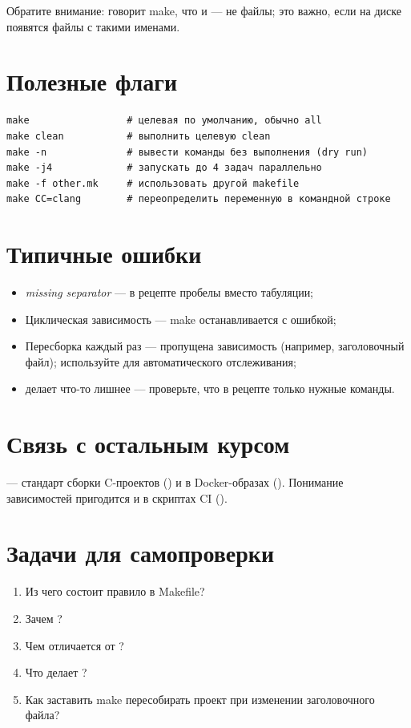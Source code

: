 Обратите внимание:  говорит make, что
 и  --- не файлы; это важно, если
на диске появятся файлы с такими именами.

\section{Полезные флаги }

\begin{verbatim}
make                 # целевая по умолчанию, обычно all
make clean           # выполнить целевую clean
make -n              # вывести команды без выполнения (dry run)
make -j4             # запускать до 4 задач параллельно
make -f other.mk     # использовать другой makefile
make CC=clang        # переопределить переменную в командной строке
\end{verbatim}

\section{Типичные ошибки}
\begin{itemize}
  \item \emph{missing separator} --- в рецепте пробелы
    вместо табуляции;
  \item Циклическая зависимость --- make останавливается
    с ошибкой;
  \item Пересборка каждый раз --- пропущена зависимость
    (например, заголовочный файл); используйте
     для автоматического отслеживания;
  \item {} делает что-то лишнее --- проверьте,
    что в рецепте только нужные команды.
\end{itemize}

\section{Связь с остальным курсом}

 --- стандарт сборки C-проектов
() и в Docker-образах
(). Понимание зависимостей
пригодится и в скриптах CI
().

\section{Задачи для самопроверки}
\begin{enumerate}
  \item Из чего состоит правило в Makefile?
  \item Зачем ?
  \item Чем  отличается от \cmd{\$<}?
  \item Что делает ?
  \item Как заставить make пересобирать проект при
    изменении заголовочного файла?
\end{enumerate}
